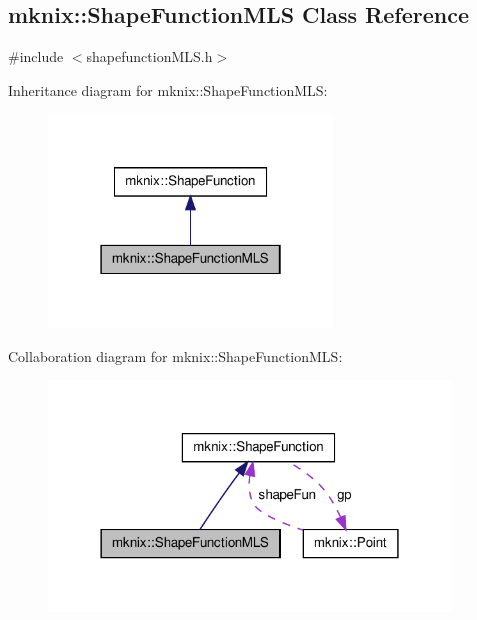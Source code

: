 \hypertarget{classmknix_1_1_shape_function_m_l_s}{\subsection{mknix\-:\-:Shape\-Function\-M\-L\-S Class Reference}
\label{classmknix_1_1_shape_function_m_l_s}
}


{\ttfamily \#include $<$shapefunction\-M\-L\-S.\-h$>$}



Inheritance diagram for mknix\-:\-:Shape\-Function\-M\-L\-S\-:\nopagebreak
\begin{figure}[H]
\begin{center}
\leavevmode
\includegraphics[width=214pt]{d3/d21/classmknix_1_1_shape_function_m_l_s__inherit__graph}
\end{center}
\end{figure}


Collaboration diagram for mknix\-:\-:Shape\-Function\-M\-L\-S\-:\nopagebreak
\begin{figure}[H]
\begin{center}
\leavevmode
\includegraphics[width=302pt]{d7/d18/classmknix_1_1_shape_function_m_l_s__coll__graph}
\end{center}
\end{figure}

